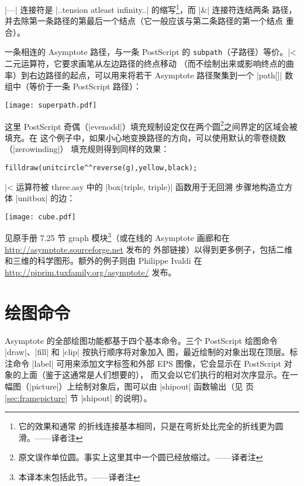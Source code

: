 \documentclass{ctexbook}
\newcommand*\prgname[1]{\textsf{#1}}
\newcommand\transnote[1]{\footnote{#1——译者注}}
\begin{document}
|---| 连接符是 |..tension atleast infinity..| 的缩写\transnote{它的效果和通常
的折线连接基本相同，只是在弯折处比完全的折线更为圆滑。}，而 |&| 连接符连结两条
路径，并去除第一条路径的第最后一个结点（它一般应该与第二条路径的第一个结点
重合）。

一条相连的 \prgname{Asymptote} 路径，与一条 \prgname{PostScript} 的
\verb=subpath=（子路径）等价。|^^| 二元运算符，它要求画笔从左边路径的终点移动
（而不绘制出来或影响终点的曲率）到右边路径的起点，可以用来将若干
\prgname{Asymptote} 路径聚集到一个 |path[]| 数组中（等价于一条
\prgname{PostScript} 路径）：

\begin{center}
  \texttt{[image: superpath.pdf]}
\end{center}

这里 \prgname{PostScript} 奇偶（|evenodd|）填充规制设定仅在两个圆\transnote{%
原文误作单位圆。事实上这里其中一个圆已经放缩过。}之间界定的区域会被填充。在
这个例子中，如果小心地变换路径的方向，可以使用默认的零卷绕数（|zerowinding|）
填充规则得到同样的效果：
\begin{lstlisting}
filldraw(unitcircle^^reverse(g),yellow,black);
\end{lstlisting}
|^^| 运算符被 \prgname{three.asy} 中的 |box(triple, triple)| 函数用于无回溯
步骤地构造立方体 |unitbox| 的边：

\begin{center}
  \texttt{[image: cube.pdf]}
\end{center}

见原手册 7.25 节 graph 模块\transnote{本译本未包括此节。}（或在线的
\prgname{Asymptote} 画廊和在 \url{http://asymptote.sourceforge.net} 发布的
外部链接）以得到更多例子，包括二维和三维的科学图形。额外的例子则由 Philippe
Ivaldi 在 \url{http://piprim.tuxfamily.org/asymptote/} 发布。



\chapter{绘图命令}
\label{chap:drawingcommands}

\prgname{Asymptote} 的全部绘图功能都基于四个基本命令。三个
\prgname{PostScript} 绘图命令 |draw|、|fill| 和 |clip| 按执行顺序将对象加入
图，最近绘制的对象出现在顶层。标注命令 |label| 可用来添加文字标签和外部 EPS
图像，它会显示在 \prgname{PostScript} 对象的上面（鉴于这通常是人们想要的），
而又会以它们执行的相对次序显示。在一幅图（|picture|）上绘制对象后，图可以由
|shipout| 函数输出（见 \pageref{sec:framepicture} 页
\ref{sec:framepicture} 节 |shipout| 的说明）。
\end{document}
